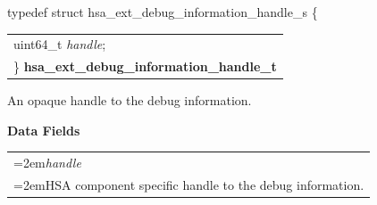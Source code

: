\documentclass[final]{book}
\newcommand{\reffld}[1]{\textit{#1}}
\begin{document}
\noindent\begin{tcolorbox}[breakable,nobeforeafter,arc=0mm,colframe=white,colback=lightgray,left=0mm]
typedef struct  hsa_ext_debug_information_handle_s \{
\vspace{-3.5mm}\begin{longtable}{@{}p{\textwidth}}
\hspace{1.7em}uint64_t \reffld{handle};\\
\}  \hypertarget{group__FinalizerCoreApi_1gaf4c0bece520460a2d77a9309905395f3}{\textbf{hsa_ext_debug_information_handle_t}}
\end{longtable}

\end{tcolorbox}
An opaque handle to the debug information.

\noindent\textbf{Data Fields}\\[-6mm]
\begin{longtable}{@{}>{\hangindent=2em}p{\textwidth}}
\reffld{handle}\\\hspace{2em}HSA component specific handle to the debug information.
\end{longtable}
\end{document}
